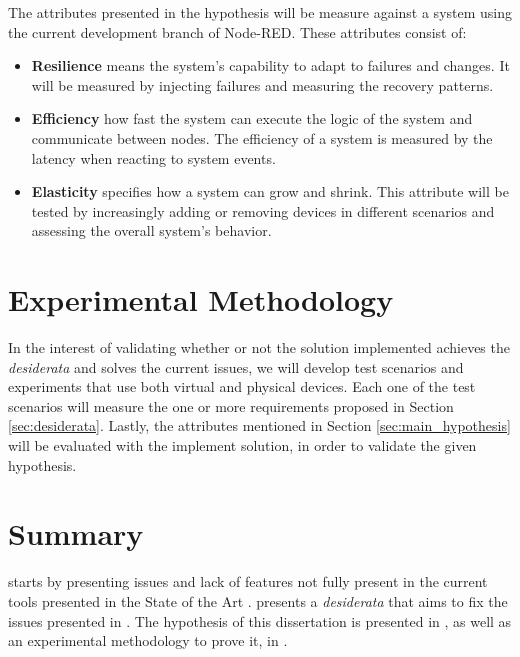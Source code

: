 The attributes presented in the hypothesis will be measure against a system using the current development branch of Node-RED. These attributes consist of:

\begin{itemize}
    \item \textbf{Resilience} means the system's capability to adapt to failures and changes. It will be measured by injecting failures and measuring the recovery patterns.
    \item \textbf{Efficiency} how fast the system can execute the logic of the system and communicate between nodes. The efficiency of a system is measured by the latency when reacting to system events.
    \item \textbf{Elasticity} specifies how a system can grow and shrink. This attribute will be tested by increasingly adding or removing devices in different scenarios and assessing the overall system's behavior.
\end{itemize}

\section{Experimental Methodology}\label{sec:exp_meth}

In the interest of validating whether or not the solution implemented achieves the \emph{desiderata} and solves the current issues, we will develop test scenarios and experiments that use both virtual and physical devices. Each one of the test scenarios will measure the one or more requirements proposed in Section \ref{sec:desiderata}. Lastly, the attributes mentioned in Section \ref{sec:main_hypothesis} will be evaluated with the implement solution, in order to validate the given hypothesis.

\section{Summary}\label{sec:stat_summary}

 starts by presenting issues and lack of features not fully present in the current tools presented in the State of the Art .  presents a \textit{desiderata} that aims to fix the issues presented in . The hypothesis of this dissertation is presented in , as well as an experimental methodology to prove it, in .
